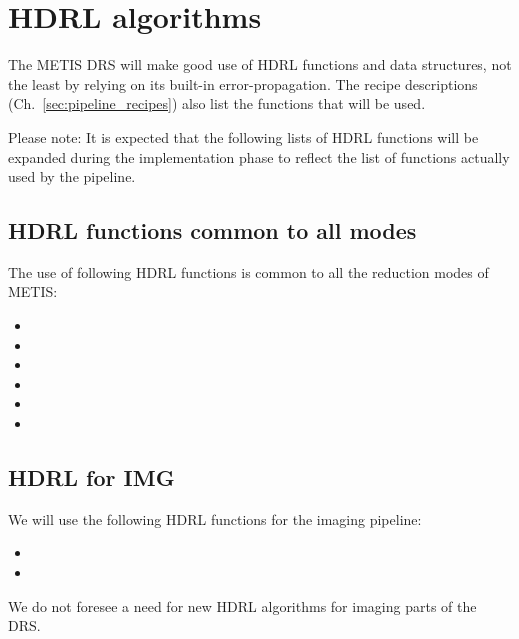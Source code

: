 \clearpage
\section{HDRL algorithms}\label{sec:hdrl_algorithms}

The METIS \ac{DRS} will make good use of \ac{HDRL} functions and data structures, not the least by relying on its built-in error-propagation.
The recipe descriptions (Ch.~\ref{sec:pipeline_recipes}) also list the functions that will be used.

Please note: It is expected that the following lists of HDRL functions will be expanded during the implementation phase to reflect the list of functions actually used by the pipeline.
\subsection{HDRL functions common to all modes}\label{ssec:hdrlcommon}
The use of following HDRL functions is common to all the reduction modes of METIS:

\begin{itemize}
    \item {}
    \item {}
    \item {}
    \item {}
    \item {}
    \item {}
\end{itemize}


\subsection{HDRL for IMG}\label{ssec:hdrlimg}
We will use the following \ac{HDRL} functions for the imaging pipeline:

\begin{itemize}
    \item {}
    \item {}
\end{itemize}

We do not foresee a need for new \ac{HDRL} algorithms for imaging parts of the \ac{DRS}.

